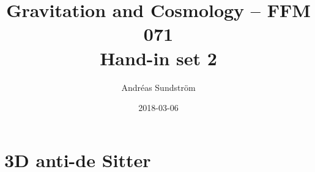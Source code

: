 \documentclass[11pt,a4paper, 
swedish, english %
]{article}
\begin{document}


%


\title{Gravitation and Cosmology -- FFM 071
\\ {\Large Hand-in set 2} }
\author{Andréas Sundström}
\date{2018-03-06}

\maketitle


\renewcommand{\thesubsection}{\arabic{section} (\roman{subsection})}
\setcounter{section}{8}

\section{3D anti-de Sitter}
\end{document}
